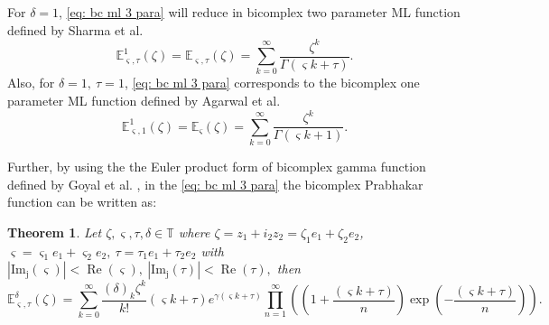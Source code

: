 \documentclass[a4paper,12pt]{article}
\newtheorem{theorem}{Theorem}[section]
\theoremstyle{remark}
\begin{document}
\noindent For $\delta=1$,  \eqref{eq: bc ml 3 para} will reduce in bicomplex two parameter ML function defined by Sharma et al. \cite{ragarwal2021sept}
\begin{equation}
\mathbb{E}_{ \varsigma,\tau}^1(\zeta)=\mathbb{E}_{ \varsigma,\tau}(\zeta)=\sum_{k=0}^{\infty}\frac{\zeta^k}{\Gamma( \varsigma k+\tau )}.  \end{equation}
Also, for $\delta=1,~\tau=1$, \eqref{eq: bc ml 3 para} corresponds to the bicomplex one parameter ML function defined by Agarwal et al. \cite{ragarwal2022}
\begin{equation}
\mathbb{E}_{ \varsigma,1}^1(\zeta)=\mathbb{E}_{ \varsigma}(\zeta)=\sum_{k=0}^{\infty}\frac{\zeta^k}{\Gamma( \varsigma k+1 )}. \end{equation}



\noindent Further, by using 
the the Euler product form of bicomplex gamma function defined by  Goyal et al. \cite{goyal2006},   in   the \eqref{eq: bc ml 3 para} the bicomplex Prabhakar function can be written as:
\begin{theorem}
	Let $\zeta,  \varsigma,\tau,\delta\in \mathbb{T}$ where $\zeta= z_1+i_2z_2= \zeta_1e_1+\zeta_2e_2$, $ \varsigma=  \varsigma_1e_1+ \varsigma_2e_2,~\tau=\tau_1e_1+\tau_2e_2$ with $|\operatorname{Im_j}( \varsigma)|<\operatorname{Re}( \varsigma),~|\operatorname{Im_j}(\tau)|<\operatorname{Re}(\tau),$ %
	then
	\begin{equation}
	\mathbb{E}_{ \varsigma,\tau}^\delta(\zeta)=\sum_{k=0}^{\infty}\frac{(\delta)_k\zeta^k}{k!} ( \varsigma k+\tau) e^{\gamma( \varsigma k+\tau )}\prod_{n=1}^{\infty}\left( \left( 1+\frac{( \varsigma k+\tau )}{n}\right) \exp \left( -\frac{( \varsigma k+\tau )}{n}\right) \right).  
	\end{equation}
	
\end{theorem}
\end{document}
